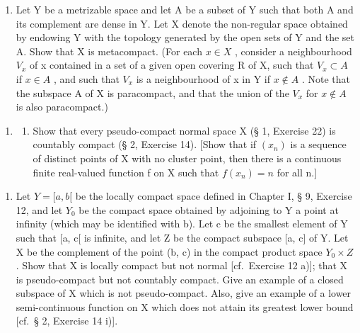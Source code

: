 \begin{enumerate}
\def\labelenumi{\alph{enumi})}
\setcounter{enumi}{4}
\tightlist
\item
  Let Y be a metrizable space and let A be a subset of Y such that both A and its complement are dense in Y. Let X denote the non-regular space obtained by endowing Y with the topology generated by the open sets of Y and the set A. Show that X is metacompact. (For each \(x \in X\) , consider a neighbourhood \(V_{x}\) of x contained in a set of a given open covering R of X, such that \(V_{x} \subset A\) if \(x \in A\) , and such that \(V_{x}\) is a neighbourhood of x in Y if \(x \notin A\) . Note that the subspace A of X is paracompact, and that the union of the \(V_{x}\) for \(x \notin A\) is also paracompact.)
\end{enumerate}

\begin{enumerate}
\def\labelenumi{\arabic{enumi})}
\setcounter{enumi}{25}
\tightlist
\item
  \begin{enumerate}
  \def\labelenumii{\alph{enumii})}
  \tightlist
  \item
    Show that every pseudo-compact normal space X (§ 1, Exercise 22) is countably compact (§ 2, Exercise 14). {[}Show that if \((x_n)\) is a sequence of distinct points of X with no cluster point, then there is a continuous finite real-valued function f on X such that \(f(x_n) = n\) for all n.{]}
  \end{enumerate}
\end{enumerate}

\begin{enumerate}
\def\labelenumi{\alph{enumi})}
\setcounter{enumi}{1}
\tightlist
\item
  Let \(Y = [a, b[\) be the locally compact space defined in Chapter I, § 9, Exercise 12, and let \(Y_{0}\) be the compact space obtained by adjoining to Y a point at infinity (which may be identified with b). Let c be the smallest element of Y such that {[}a, c{[} is infinite, and let Z be the compact subspace {[}a, c{]} of Y. Let X be the complement of the point (b, c) in the compact product space \(Y_{0} \times Z\) . Show that X is locally compact but not normal {[}cf.~Exercise 12 a){]}; that X is pseudo-compact but not countably compact. Give an example of a closed subspace of X which is not pseudo-compact. Also, give an example of a lower semi-continuous function on X which does not attain its greatest lower bound {[}cf.~§ 2, Exercise 14 i){]}.
\end{enumerate}

